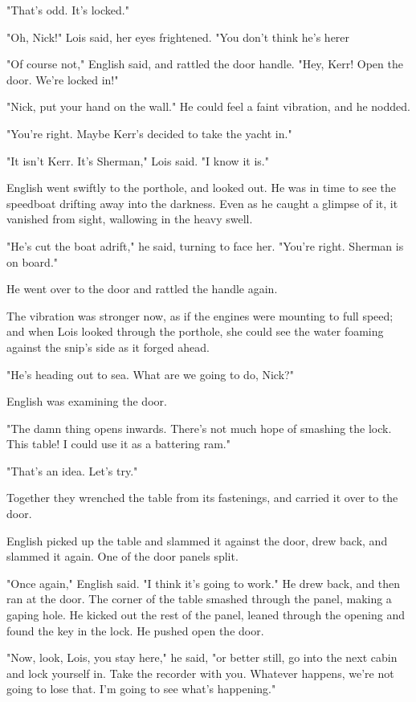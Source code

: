 \documentclass{novel}
\begin{document}
"That's odd. It's locked."

"Oh, Nick!" Lois said, her eyes frightened. "You don't think he's herer

"Of course not," English said, and rattled the door handle. "Hey, Kerr! Open the door. We're locked in!"

"Nick, put your hand on the wall." He could feel a faint vibration, and he nodded.

"You're right. Maybe Kerr's decided to take the yacht in."

"It isn't Kerr. It's Sherman," Lois said. "I know it is."

English went swiftly to the porthole, and looked out. He was in time to see the speedboat drifting away into the darkness. Even as he caught a glimpse of it, it vanished from sight, wallowing in the heavy swell.

"He's cut the boat adrift," he said, turning to face her. "You're right. Sherman is on board."

He went over to the door and rattled the handle again.

The vibration was stronger now, as if the engines were mounting to full speed; and when Lois looked through the porthole, she could see the water foaming against the snip's side as it forged ahead.

"He's heading out to sea. What are we going to do, Nick?"

English was examining the door.

"The damn thing opens inwards. There's not much hope of smashing the lock. This table! I could use it as a battering ram."

"That's an idea. Let's try."

Together they wrenched the table from its fastenings, and carried it over to the door.

English picked up the table and slammed it against the door, drew back, and slammed it again. One of the door panels split.

"Once again," English said. "I think it's going to work." He drew back, and then ran at the door. The corner of the table smashed through the panel, making a gaping hole. He kicked out the rest of the panel, leaned through the opening and found the key in the lock. He pushed open the door.

"Now, look, Lois, you stay here," he said, "or better still, go into the next cabin and lock yourself in. Take the recorder with you. Whatever happens, we're not going to lose that. I'm going to see what's happening."
\end{document}
